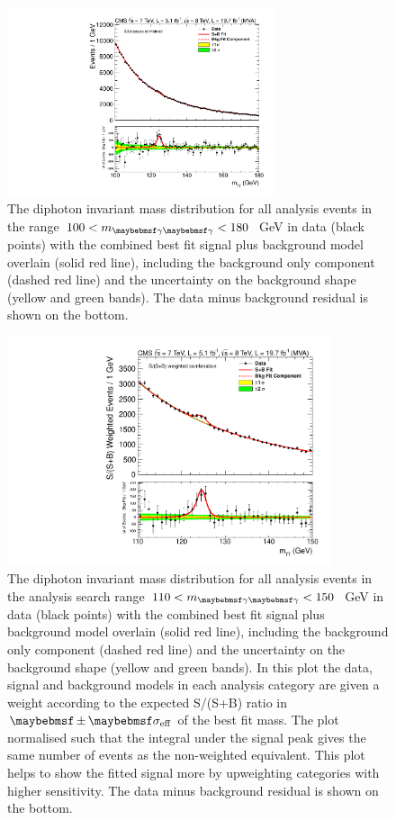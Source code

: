 \begin{figure}
  \includegraphics[width=0.7\textwidth]{results/plots/mgg_mva_fullrange_combcat78TeV_unweighted.pdf}
  \caption{The diphoton invariant mass distribution for all analysis events in the range $100<\mgg<180$~GeV in data (black points) with the combined best fit signal plus background model overlain (solid red line), including the background only component (dashed red line) and the uncertainty on the background shape (yellow and green bands). The data minus background residual is shown on the bottom.}
  \label{fig:sbfit_unw}
\end{figure}

\begin{figure}
  \includegraphics[width=0.85\textwidth]{results/plots/mgg_mva_110_150_combcat78TeV_weighted.pdf}
  \caption{The diphoton invariant mass distribution for all analysis events in the analysis search range $110<\mgg<150$~GeV in data (black points) with the combined best fit signal plus background model overlain (solid red line), including the background only component (dashed red line) and the uncertainty on the background shape (yellow and green bands). In this plot the data, signal and background models in each analysis category are given a weight according to the expected S/(S+B) ratio in $\pm\sigeff$ of the best fit mass. The plot normalised such that the integral under the signal peak gives the same number of events as the non-weighted equivalent. This plot helps to show the fitted signal more by upweighting categories with higher sensitivity. The data minus background residual is shown on the bottom.}
  \label{fig:sbfit_w}
\end{figure}

